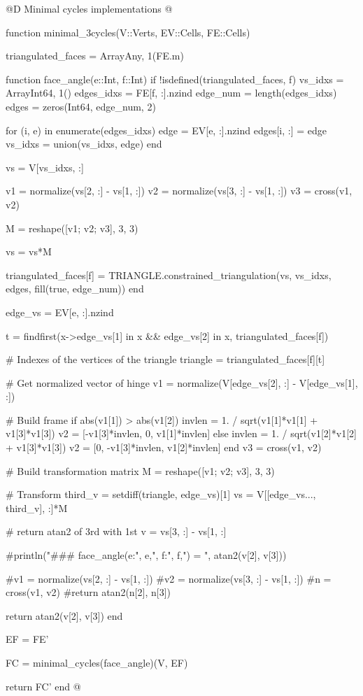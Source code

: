 @D Minimal cycles implementations
@{function minimal_3cycles(V::Verts, EV::Cells, FE::Cells)

    triangulated_faces = Array{Any, 1}(FE.m)

    function face_angle(e::Int, f::Int)
        if !isdefined(triangulated_faces, f)
            vs_idxs = Array{Int64, 1}()
            edges_idxs = FE[f, :].nzind
            edge_num = length(edges_idxs)
            edges = zeros(Int64, edge_num, 2)

            for (i, e) in enumerate(edges_idxs)
                edge = EV[e, :].nzind
                edges[i, :] = edge
                vs_idxs = union(vs_idxs, edge)
            end
            
            vs = V[vs_idxs, :]

            v1 = normalize(vs[2, :] - vs[1, :])
            v2 = normalize(vs[3, :] - vs[1, :])
            v3 = cross(v1, v2)

            M = reshape([v1; v2; v3], 3, 3)

            vs = vs*M

            triangulated_faces[f] = TRIANGLE.constrained_triangulation(vs, vs_idxs, edges, fill(true, edge_num))
        end

        edge_vs = EV[e, :].nzind

        t = findfirst(x->edge_vs[1] in x && edge_vs[2] in x, triangulated_faces[f])

        # Indexes of the vertices of the triangle
        triangle = triangulated_faces[f][t]

        # Get normalized vector of hinge
        v1 = normalize(V[edge_vs[2], :] - V[edge_vs[1], :])

        # Build frame
        if abs(v1[1]) > abs(v1[2])
            invlen = 1. / sqrt(v1[1]*v1[1] + v1[3]*v1[3])
            v2 = [-v1[3]*invlen, 0, v1[1]*invlen]
        else
            invlen = 1. / sqrt(v1[2]*v1[2] + v1[3]*v1[3])
            v2 = [0, -v1[3]*invlen, v1[2]*invlen]
        end
        v3 = cross(v1, v2)

        # Build transformation matrix
        M = reshape([v1; v2; v3], 3, 3)

        # Transform
        third_v = setdiff(triangle, edge_vs)[1]
        vs = V[[edge_vs..., third_v], :]*M

        # return atan2 of 3rd with 1st
        v = vs[3, :] - vs[1, :]

        #println("### face_angle(e:", e,", f:", f,") = ", atan2(v[2], v[3]))

        #v1 = normalize(vs[2, :] - vs[1, :])
        #v2 = normalize(vs[3, :] - vs[1, :])
        #n = cross(v1, v2)
        #return atan2(n[2], n[3])

        return atan2(v[2], v[3])
    end

    EF = FE'

    FC = minimal_cycles(face_angle)(V, EF)

    return FC'
end
@}
